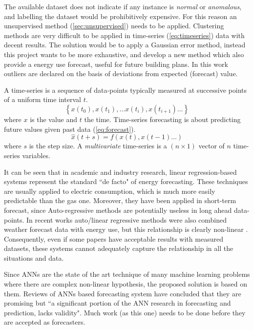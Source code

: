\documentclass{sig-alternate-sigmod07}
\begin{document}
The available dataset does not indicate if any instance is \emph{normal} or \emph{anomalous}, and labelling the dataset would be prohibitively expensive. For this reason an unsupervised method (\cref{sec:unsupervised}) needs to be applied. Clustering methods are very difficult to be applied in time-series (\cref{eq:timeseries}) data with decent results. The solution would be to apply a Gaussian error method, instead this project wants to be more exhaustive, and develop a new method which also provide a energy use forecast, useful for future building plans. In this work outliers are declared on the basis of deviations from expected (forecast) value.

A time-series is a sequence of data-points typically measured at successive points of a uniform time interval $t$.
\begin{equation}\label{eq:timeseries}\left\{x(t_0), x(t_1), \ldots x(t_i), x(t_{i+1}) \ldots \right\}\end{equation}
where $x$ is the value and $t$ the time. Time-series forecasting is about predicting future values given past data (\cref{eq:forecast}). 
\begin{equation}\label{eq:forecast}\hat{x}(t+s) = f\left(x(t), x(t-1) \ldots \right) \end{equation}
where $s$ is the step size. A \emph{multivariate} time-series is a $(n\times1)$ vector of $n$ time-series variables.

It can be seen that in academic and industry research, linear regression-based systems represent the standard ``de facto" of energy forecasting. These techniques are usually applied to electric consumption, which is much more easily predictable than the gas one. Moreover, they have been applied in short-term forecast, since Auto-regressive methods are potentially useless in long ahead data-points. In recent works auto/linear regressive methods were also combined weather forecast data with energy use, but this relationship is clearly non-linear \cite{hippert2001neural}. Consequently, even if some papers have acceptable results with measured datasets, these systems cannot adequately capture the relationship in all the situations and data.

Since ANNs are the state of the art technique of many machine learning problems where there are complex non-linear hypothesis, the proposed solution is based on them. Reviews of ANNs based forecasting system have concluded that they are promising but ``a significant portion of the ANN research in forecasting and prediction, lacks validity". Much work (as this one) needs to be done before they are accepted as forecasters. 
\end{document}
